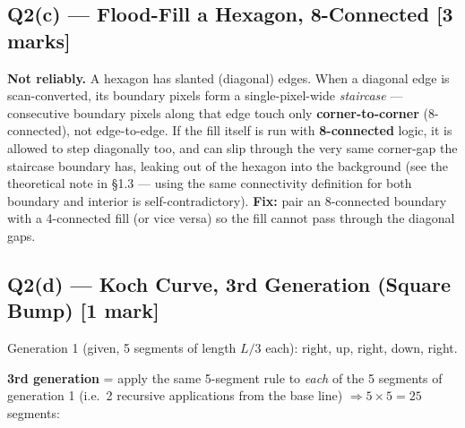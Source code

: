 \documentclass[12pt, a4paper]{article}
\newenvironment{solutionbox}{\begin{mdframed}[style=solutionframe]}{\end{mdframed}}
\newenvironment{answerbox}{\begin{mdframed}[style=answerframe]}{\end{mdframed}}
\begin{document}
\subsection*{Q2(c) --- Flood-Fill a Hexagon, 8-Connected [3 marks]}
\begin{answerbox}
\textbf{Not reliably.} A hexagon has slanted (diagonal) edges. When a diagonal edge is scan-converted, its boundary pixels form a single-pixel-wide \emph{staircase} --- consecutive boundary pixels along that edge touch only \textbf{corner-to-corner} (8-connected), not edge-to-edge. If the fill itself is run with \textbf{8-connected} logic, it is allowed to step diagonally too, and can slip through the very same corner-gap the staircase boundary has, leaking out of the hexagon into the background (see the theoretical note in \S1.3 --- using the same connectivity definition for both boundary and interior is self-contradictory). \textbf{Fix:} pair an 8-connected boundary with a 4-connected fill (or vice versa) so the fill cannot pass through the diagonal gaps.
\end{answerbox}

\subsection*{Q2(d) --- Koch Curve, 3rd Generation (Square Bump) [1 mark]}
\begin{solutionbox}
Generation 1 (given, 5 segments of length $L/3$ each): right, up, right, down, right.
\end{solutionbox}
\begin{center}
\quad
{}
\end{center}
\begin{answerbox}
\textbf{3rd generation} = apply the same 5-segment rule to \emph{each} of the 5 segments of generation 1 (i.e.\ 2 recursive applications from the base line) $\Rightarrow 5\times5=25$ segments:
\begin{center}
\end{center}
\end{answerbox}
\end{document}
